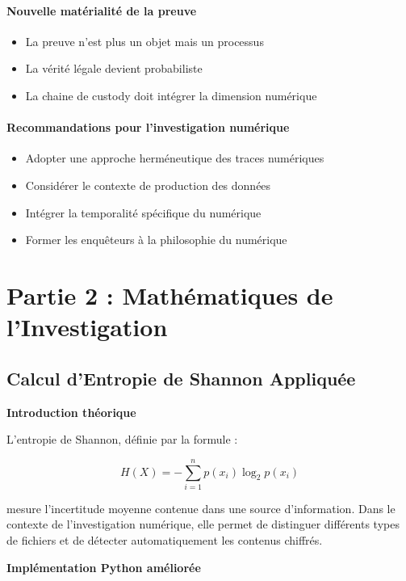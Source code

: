 \documentclass[12pt,a4paper]{article}
\begin{document}
\paragraph{Nouvelle matérialité de la preuve}
\begin{itemize}
\item La preuve n'est plus un objet mais un processus
\item La vérité légale devient probabiliste
\item La chaine de custody doit intégrer la dimension numérique
\end{itemize}

\paragraph{Recommandations pour l'investigation numérique}
\begin{itemize}
\item Adopter une approche herméneutique des traces numériques
\item Considérer le contexte de production des données
\item Intégrer la temporalité spécifique du numérique
\item Former les enquêteurs à la philosophie du numérique
\end{itemize}

\section{Partie 2 : Mathématiques de l'Investigation}

\subsection{Calcul d'Entropie de Shannon Appliquée}

\textbf{Introduction théorique}

L'entropie de Shannon, définie par la formule :

\[H(X) = -\sum_{i=1}^{n} p(x_i) \log_2 p(x_i)\]

mesure l'incertitude moyenne contenue dans une source d'information. Dans le contexte de l'investigation numérique, elle permet de distinguer différents types de fichiers et de détecter automatiquement les contenus chiffrés.

\textbf{Implémentation Python améliorée}
\end{document}

